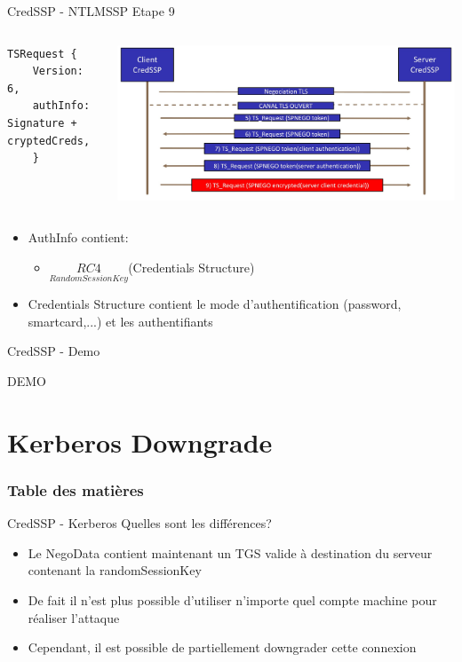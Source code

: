 \documentclass{beamer}
\begin{document}
\begin{frame}[fragile]{CredSSP - NTLMSSP Etape 9 }
	 \begin{columns}[T]
	 	 \begin{lstlisting}[frame=single,basicstyle=\tiny]
TSRequest {
	Version:     6,
	authInfo: Signature + cryptedCreds,
	}
	\end{lstlisting}
	\includegraphics[scale=0.07]{step9.jpg}
	\end{columns}
		\begin{itemize}
		\item AuthInfo contient:
			\begin{itemize}
			\item $\underset{RandomSessionKey}{RC4}$(Credentials Structure)
			\end{itemize}
		\item Credentials Structure contient le mode d'authentification (password, smartcard,...) et les authentifiants
		\end{itemize}
\end{frame}

\begin{frame}[fragile]{CredSSP - Demo}
	 \begin{center} DEMO
	 \end{center}
\end{frame}

\section{Kerberos Downgrade}

\begin{frame}
	\frametitle{Table des matières}
	\tableofcontents[currentsection]
\end{frame}
\begin{frame}[fragile]{CredSSP - Kerberos}
Quelles sont les différences?
\begin{itemize}
\item Le NegoData contient maintenant un TGS valide à destination du serveur contenant la randomSessionKey
\item De fait il n'est plus possible d'utiliser n'importe quel compte machine pour réaliser l'attaque
\item Cependant, il est possible de partiellement downgrader cette connexion
\end{itemize}
\end{frame}
\end{document}
